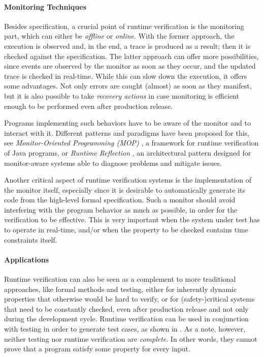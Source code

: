 \paragraph{Monitoring Techniques}
Besides specification, a crucial point of runtime verification is the monitoring part, which can either be \emph{offline} or \emph{online}.
With the former approach, the execution is observed and, in the end, a trace is produced as a result; then it is checked against the specification.
The latter approach can offer more possibilities, since events are observed by the monitor as soon as they occur, and the updated trace is checked in real-time.
While this can slow down the execution, it offers some advantages.
Not only errors are caught (almost) as soon as they manifest, but it is also possible to take \emph{recovery actions} \cite{ancona2015global} in case
monitoring is efficient enough to be performed even after production release.

Programs implementing such behaviors have to be aware of the monitor and to interact with it.
Different patterns and paradigms have been proposed for this, see \emph{Monitor-Oriented Programming (MOP)} \cite{mop}, a framework for runtime verification of Java programs, or \emph{Runtime Reflection} \cite{rr}, an architectural pattern designed for monitor-aware systems able to diagnose problems and mitigate issues.

Another critical aspect of runtime verification systems is the implementation of the monitor itself, especially since it is desirable to automatically generate its code from the high-level formal specification. %
Such a monitor should avoid interfering with the program behavior as much as possible, in order for the verification to be effective.
This is very important when the system under test has to operate in real-time, and/or when the property to be checked contains time constraints itself.

\paragraph{Applications}
Runtime verification can also be seen as a complement to more traditional approaches, like formal methods and testing, either for inherently dynamic properties that otherwise would be hard to verify, or for (safety-)critical systems that need to be constantly checked, even after production release and not only during the development cycle.
Runtime verification can be used in conjunction with testing in order to generate test cases, as shown in \cite{artho2005combining}.
As a note, however, neither testing nor runtime verification are \emph{complete}.
In other words, they cannot prove that a program satisfy some property for every input.

